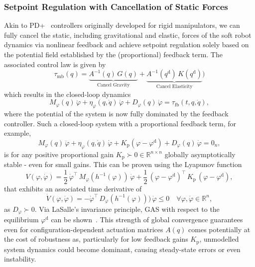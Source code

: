 \subsubsection{Setpoint Regulation with Cancellation of Static Forces}
Akin to PD+~\citep{kelly1996class, kelly1998global} controllers originally developed for rigid manipulators, we can fully cancel the static, including gravitational and elastic, forces of the soft robot dynamics via nonlinear feedback and achieve setpoint regulation solely based on the potential field established by the (proportional) feedback term. The associated control law is given by~\citep{patterson2024design, pustina2025analysis}
\begin{equation}
    \tau_\mathrm{mb}(q) =  \underbrace{A^{-1}(q) \, G(q)}_\text{Cancel Gravity} + \underbrace{A^{-1}(q^\mathrm{d}) \, K(q^\mathrm{d})}_\text{Cancel Elasticity} \big )
\end{equation}
which results in the closed-loop dynamics
\begin{equation}
    M_\varphi(q) \, \ddot{\varphi} + \eta_\varphi(q,\dot{q}) \, \dot{\varphi} + D_\varphi(q) \, \dot{\varphi} = \tau_\mathrm{fb}(t, q, \dot{q}),
\end{equation}
where the potential of the system is now fully dominated by the feedback controller.
Such a closed-loop system with a proportional feedback term, for example,
\begin{equation}
    M_\varphi(q) \, \ddot{\varphi} + \eta_\varphi(q,\dot{q}) \, \dot{\varphi} +  K_\mathrm{p} ( \varphi - \varphi^\mathrm{d}) + D_\varphi(q) \, \dot{\varphi} = 0_n,
\end{equation}
is for any positive proportional gain $K_\mathrm{p} \succ 0 \in \mathbb{R}^{n \times n}$ globally asymptotically stable - even for small gains.
This can be proven using the Lyapunov function
\begin{equation}
    V(\varphi,\dot{\varphi}) = \frac{1}{2} \, \dot{\varphi}^\top \, M_\varphi(h^{-1}(\varphi)) \, \dot{\varphi} + \frac{1}{2} \, \left (\varphi - \varphi^\mathrm{d} \right )^\top \, K_\mathrm{p} \, \left (\varphi - \varphi^\mathrm{d} \right ),
\end{equation}
that exhibits an associated time derivative of
\begin{equation}
    \dot{V}(\varphi,\dot{\varphi}) = - \dot{\varphi}^\top \, D_\varphi(h^{-1}(\varphi))) \, \dot{\varphi} \leq 0 \quad \forall \varphi, \dot{\varphi} \in \mathbb{R}^n,
\end{equation}
as $D_\varphi \succ 0$. Via LaSalle's invariance principle, \gls{GAS} with respect to the equilibrium $\varphi^\mathrm{d}$ can be shown~\citep{khalil2002nonlinear}.
This strength of global convergence guarantees even for configuration-dependent actuation matrices $A(q)$ comes potentially at the cost of robustness as, particularly for low feedback gains $K_\mathrm{p}$, unmodelled system dynamics could become dominant, causing steady-state errors or even instability.

